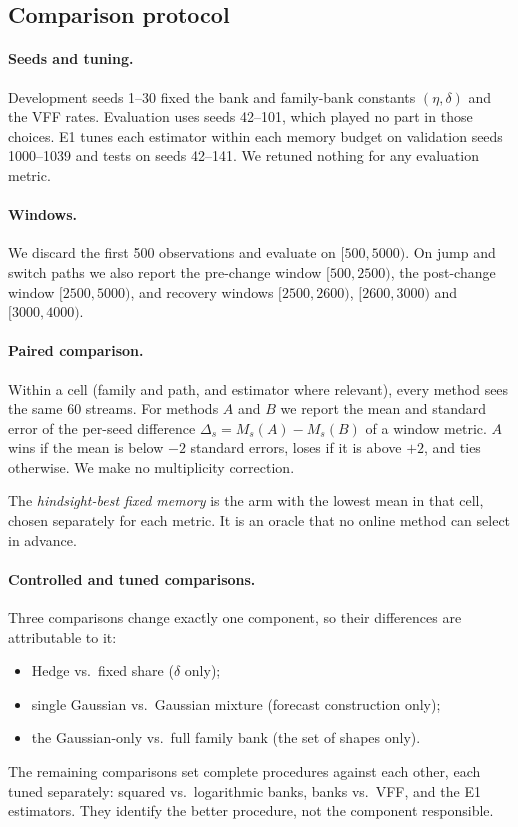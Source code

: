 \subsection{Comparison protocol}\label{sec:ch6-protocol}

\paragraph{Seeds and tuning.}
Development seeds 1--30 fixed the bank and family-bank constants $(\eta, \delta)$ and the VFF rates.
Evaluation uses seeds 42--101, which played no part in those choices.
E1 tunes each estimator within each memory budget on validation seeds 1000--1039 and tests on seeds 42--141.
We retuned nothing for any evaluation metric.

\paragraph{Windows.}
We discard the first 500 observations and evaluate on $[500, 5000)$.
On jump and switch paths we also report the pre-change window $[500, 2500)$, the post-change window $[2500, 5000)$, and recovery windows $[2500, 2600)$, $[2600, 3000)$ and $[3000, 4000)$.

\paragraph{Paired comparison.}
Within a cell (family and path, and estimator where relevant), every method sees the same 60 streams.
For methods $A$ and $B$ we report the mean and standard error of the per-seed difference $\Delta_s = M_s(A) - M_s(B)$ of a window metric.
$A$ wins if the mean is below $-2$ standard errors, loses if it is above $+2$, and ties otherwise.
We make no multiplicity correction.

The \emph{hindsight-best fixed memory} is the arm with the lowest mean in that cell, chosen separately for each metric.
It is an oracle that no online method can select in advance.

\paragraph{Controlled and tuned comparisons.}
Three comparisons change exactly one component, so their differences are attributable to it:
\begin{itemize}
  \item Hedge vs.\ fixed share ($\delta$ only);
  \item single Gaussian vs.\ Gaussian mixture (forecast construction only);
  \item the Gaussian-only vs.\ full family bank (the set of shapes only).
\end{itemize}
The remaining comparisons set complete procedures against each other, each tuned separately: squared vs.\ logarithmic banks, banks vs.\ VFF, and the E1 estimators.
They identify the better procedure, not the component responsible.
